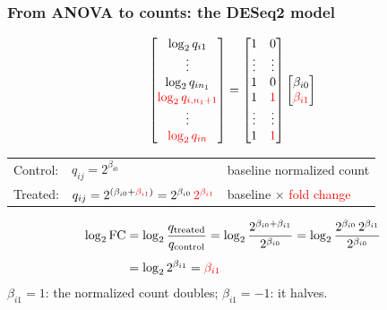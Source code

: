 \documentclass{beamer}
\begin{document}
\begin{frame}
\frametitle{From ANOVA to counts: the DESeq2 model}
\vspace{0.3em}
\[
\begin{bmatrix}
\log_2 q_{i1} \\
\vdots \\
\log_2 q_{in_1} \\
\textcolor{red}{\log_2 q_{i,n_1+1}} \\
\vdots \\
\textcolor{red}{\log_2 q_{in}}
\end{bmatrix}
=
\begin{bmatrix}
1 & 0 \\
\vdots & \vdots \\
1 & 0 \\
1 & \textcolor{red}{1} \\
\vdots & \vdots \\
1 & \textcolor{red}{1}
\end{bmatrix}
\begin{bmatrix}
\beta_{i0} \\
\textcolor{red}{\beta_{i1}}
\end{bmatrix}
\]

\vspace{0.2em}
\begin{tabular}{lll}
Control: & $q_{ij} = 2^{\beta_{i0}}$ & baseline normalized count \\
Treated: & $q_{ij} = 2^{(\beta_{i0} + \textcolor{red}{{\beta_{i1}}})} = 2^{\beta_{i0}}\,\textcolor{red}{2^{\beta_{i1}}}$ & baseline $\times$ \textcolor{red}{fold change} \\
\end{tabular}

\vspace{0.1em}
\normalsize
\begin{align*}
\log_2\text{FC}
&= \log_2\frac{q_{\text{treated}}}{q_{\text{control}}}
= \log_2\frac{2^{\beta_{i0}+\beta_{i1}}}{2^{\beta_{i0}}}
= \log_2\frac{2^{\beta_{i0}}\,2^{\beta_{i1}}}{2^{\beta_{i0}}} \\[0.4em]
&= \log_2 2^{\beta_{i1}} = \textcolor{red}{\beta_{i1}}
\end{align*}
$\beta_{i1}=1$: the normalized count doubles; $\beta_{i1}=-1$: it halves.
\end{frame}
\end{document}
